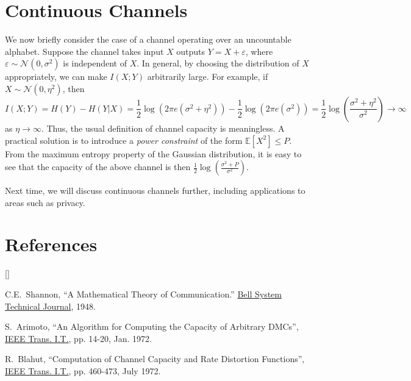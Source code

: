 \documentclass[twoside]{article}
\def\beginrefs{\begin{list}%
        {[\arabic{equation}]}{\usecounter{equation}
         \setlength{\leftmargin}{2.0truecm}\setlength{\labelsep}{0.4truecm}%
         \setlength{\labelwidth}{1.6truecm}}}
\def\endrefs{\end{list}}
\def\bibentry#1{\item[\hbox{[#1]}]}
\newcommand\E{\mathbb{E}}       %
\newcommand\e{\varepsilon}
\begin{document}
\section{Continuous Channels}
We now briefly consider the case of a channel operating over an uncountable
alphabet. Suppose the channel takes input $X$ outputs $Y = X + \e$, where
$\e \sim \mathcal{N}(0,\sigma^2)$ is independent of $X$. In general, by
choosing the distribution of $X$ appropriately, we can make $I(X; Y)$
arbitrarily large. For example, if $X \sim \mathcal{N}(0,\eta^2)$, then
\[I(X;Y) = H(Y) - H(Y | X)
    = \frac{1}{2} \log\left( 2\pi e(\sigma^2 + \eta^2) \right)
    - \frac{1}{2} \log\left( 2\pi e(\sigma^2) \right)
    = \frac{1}{2} \log\left( \frac{\sigma^2 + \eta^2}{\sigma^2} \right)
    \to \infty
\]
as $\eta \to \infty$. Thus, the usual definition of channel capacity is
meaningless. A practical solution is to introduce a \emph{power constraint} of
the form $\E[X^2] \leq P$. From the maximum entropy property of the Gaussian
distribution, it is easy to see that the capacity of the above channel is then
$\frac{1}{2} \log\left( \frac{\sigma^2 + P}{\sigma^2} \right)$.

Next time, we will discuss continuous channels further, including applications
to areas such as privacy.

\section*{References}
\beginrefs
\bibentry{S48}{\sc C.E.~Shannon}, ``A Mathematical Theory of Communication.''
\underline{Bell System Technical Journal}, 1948.
\bibentry{A72}{\sc S.~Arimoto}, ``An Algorithm for Computing the Capacity of
Arbitrary DMCs'', \underline{IEEE Trans. I.T.}, pp. 14-20, Jan. 1972.
\bibentry{B72}{\sc R.~Blahut}, ``Computation of Channel Capacity and Rate
Distortion Functions'', \underline{IEEE Trans. I.T.}, pp. 460-473, July 1972.
\endrefs
\end{document}
